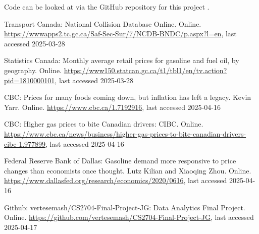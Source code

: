 \documentclass[runningheads]{llncs}
\begin{document}
Code can be looked at via the GitHub repository for this project \cite{ref_url3}.
%
%
%
% 
% 
%
\begin{thebibliography}{8}
Transport Canada: National Collision Database Online. Online. \url{https://wwwapps2.tc.gc.ca/Saf-Sec-Sur/7/NCDB-BNDC/p.aspx?l=en}, last accessed 2025-03-28

Statistics Canada: Monthly average retail prices for gasoline and fuel oil, by geography. Online. \url{https://www150.statcan.gc.ca/t1/tbl1/en/tv.action?pid=1810000101}, last accessed 2025-03-28

CBC: Prices for many foods coming down, but inflation has left a legacy. Kevin Yarr. Online. \url{https://www.cbc.ca/1.7192916}, last accessed 2025-04-16

CBC: Higher gas prices to bite Canadian drivers: CIBC. Online. \url{https://www.cbc.ca/news/business/higher-gas-prices-to-bite-canadian-drivers-cibc-1.977899}, last accessed 2025-04-16

Federal Reserve Bank of Dallas: Gasoline demand more responsive to price changes than economists once thought. Lutz Kilian and Xiaoqing Zhou. Online. \url{https://www.dallasfed.org/research/economics/2020/0616}, last accessed 2025-04-16

Github: vertesemash/CS2704-Final-Project-JG: Data Analytics Final Project. Online. \url{https://github.com/vertesemash/CS2704-Final-Project-JG}, last accessed 2025-04-17

\end{thebibliography}
\end{document}
